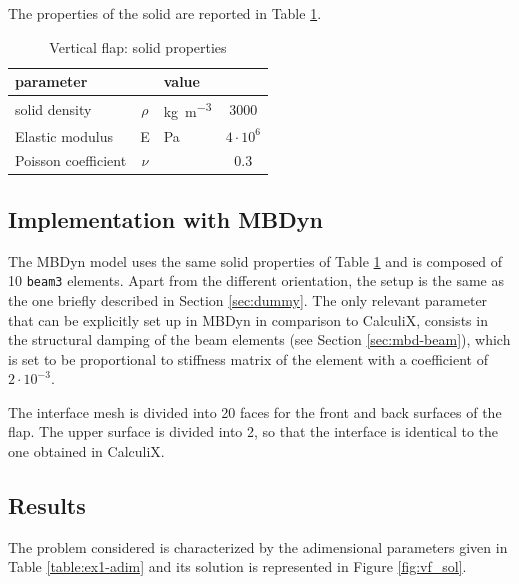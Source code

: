The properties of the solid are reported in Table \ref{table:ex1-solid}.

\begin{table}[!h]
	\begin{center}
		\begin{tabular}{ l c  l | c } 
			parameter & & value &    \\ 
			\hline
			solid density  & $\rho$ & \si{kg.m^{-3}} & 3000    \\
			Elastic modulus  & E & \si{Pa} & $4\cdot 10^6$    \\
			Poisson coefficient & $\nu$ & & $0.3$  \\
		\end{tabular}
	\end{center}
	\caption{Vertical flap: solid properties}
	\label{table:ex1-solid}
\end{table}

 
\subsection{Implementation with MBDyn}


The MBDyn model uses the same solid properties of Table \ref{table:ex1-solid} and is composed of 10 \texttt{beam3} elements. Apart from the different orientation, the setup is the same as the one briefly described in Section \ref{sec:dummy}. The only relevant parameter that can be explicitly set up in MBDyn in comparison to CalculiX, consists in the structural damping of the beam elements (see Section \ref{sec:mbd-beam}), which is set to be proportional to stiffness matrix of the element with a coefficient of $2\cdot10^{-3}$.

The interface mesh is divided into 20 faces for the front and back surfaces of the flap. The upper surface is divided into 2, so that the interface is identical to the one obtained in CalculiX. 



\subsection{Results}

The problem considered is characterized by the adimensional parameters given in Table \ref{table:ex1-adim} and its solution is represented in Figure \ref{fig:vf_sol}.


